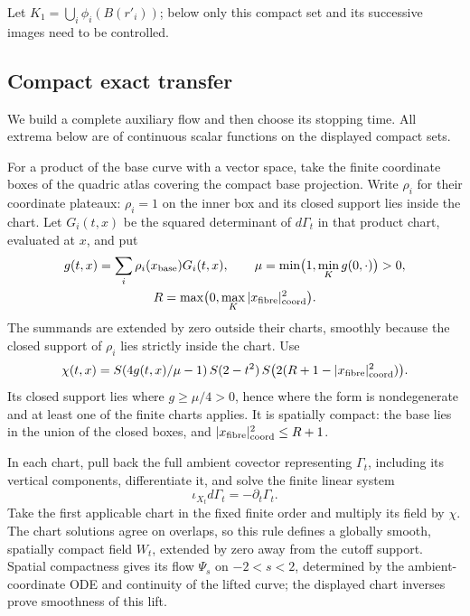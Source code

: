 Let $K_1=\bigcup_i\phi_i(B(r'_i))$; below only this compact set and its successive images
need to be controlled.

\subsection{Compact exact transfer}\label{sec:sxr-moser}

We build a complete auxiliary flow and then choose its stopping time. All extrema below are of
continuous scalar functions on the displayed compact sets.

For a product of the base curve with a vector space, take the finite coordinate
boxes of the quadric atlas covering the compact base projection. Write $\rho_i$
for their coordinate plateaux: $\rho_i=1$ on the inner box and its closed support
lies inside the chart. Let $G_i(t,x)$ be the squared determinant of $d\Gamma_t$
in that product chart, evaluated at $x$, and put
\[
 \begin{gathered}
 g(t,x)=\sum_i\rho_i(x_{\rm base})G_i(t,x),\qquad
 \mu=\min\bigl(1,\min_K g(0,\cdot)\bigr)>0,\\
 R=\max\bigl(0,\max_K |x_{\rm fibre}|_{\rm coord}^2\bigr).
 \end{gathered}
\]
The summands are extended by zero outside their charts, smoothly because the closed support
of $\rho_i$ lies strictly inside the chart. Use
\begin{equation}\label{eq:sxr-native-cutoff}
 \chi(t,x)=S(4g(t,x)/\mu-1)\,S(2-t^2)\,
 S\bigl(2(R+1-|x_{\rm fibre}|_{\rm coord}^2)\bigr).
\end{equation}
Its closed support lies where $g\ge\mu/4>0$, hence where the form is nondegenerate and at
least one of the finite charts applies. It is spatially compact: the base lies in the union of the closed boxes, and
$|x_{\rm fibre}|_{\rm coord}^2\le R+1$.

In each chart, pull back the full ambient covector representing $\Gamma_t$, including its
vertical components, differentiate it, and solve the finite linear system
\[
 \iota_{X_t}d\Gamma_t=-\partial_t\Gamma_t.
\]
Take the first applicable chart in the fixed finite order and multiply its field by $\chi$.
The chart solutions agree on overlaps, so this rule defines a globally smooth, spatially compact
field $W_t$, extended by zero away from the cutoff support. Spatial compactness gives its flow
$\Psi_s$ on $-2<s<2$, determined by the ambient-coordinate ODE and continuity of the lifted curve;
the displayed chart inverses prove smoothness of this lift.

